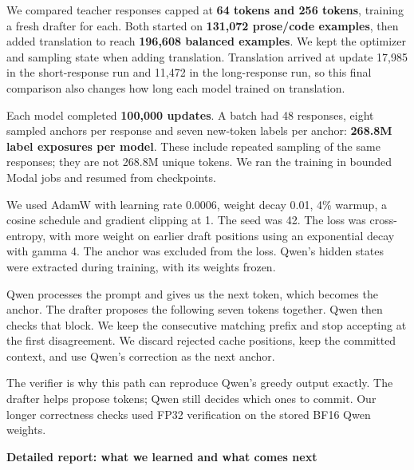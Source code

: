 \documentclass[11pt,a4paper]{article}
\begin{document}
We compared teacher responses capped at \textbf{64 tokens and 256 tokens}, training a fresh drafter for each. Both started on \textbf{131,072 prose/code examples}, then added translation to reach \textbf{196,608 balanced examples}. We kept the optimizer and sampling state when adding translation. Translation arrived at update 17,985 in the short-response run and 11,472 in the long-response run, so this final comparison also changes how long each model trained on translation.

\vspace{2mm}{\large\bfseries The training setup\par}

Each model completed \textbf{100,000 updates}. A batch had 48 responses, eight sampled anchors per response and seven new-token labels per anchor: \textbf{268.8M label exposures per model}. These include repeated sampling of the same responses; they are not 268.8M unique tokens. We ran the training in bounded Modal jobs and resumed from checkpoints.

We used AdamW with learning rate 0.0006, weight decay 0.01, 4\% warmup, a cosine schedule and gradient clipping at 1. The seed was 42. The loss was cross-entropy, with more weight on earlier draft positions using an exponential decay with gamma 4. The anchor was excluded from the loss. Qwen's hidden states were extracted during training, with its weights frozen.

\vspace{2mm}{\large\bfseries How generation works\par}

Qwen processes the prompt and gives us the next token, which becomes the anchor. The drafter proposes the following seven tokens together. Qwen then checks that block. We keep the consecutive matching prefix and stop accepting at the first disagreement. We discard rejected cache positions, keep the committed context, and use Qwen's correction as the next anchor.

The verifier is why this path can reproduce Qwen's greedy output exactly. The drafter helps propose tokens; Qwen still decides which ones to commit. Our longer correctness checks used FP32 verification on the stored BF16 Qwen weights.

\newpage\small

{\Large\bfseries Detailed report: what we learned and what comes next\par}\vspace{3mm}
\end{document}
